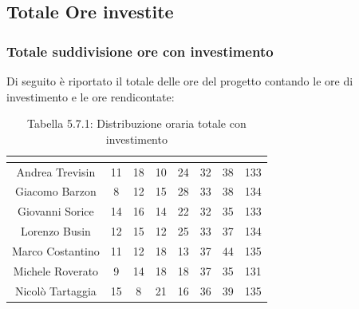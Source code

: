 \subsection{Totale Ore investite}

\subsubsection{Totale suddivisione ore con investimento}
Di seguito è riportato il totale delle ore del progetto contando le ore di investimento e le ore rendicontate:

\renewcommand{\arraystretch}{1.5}
\begin{table}[H]
\begin{center}
\begin{tabular}{|c|c|c|c|c|c|c|c|}
\hline
\rowcolor{title_row}
\textbf{\color{title_text}{Nome}} & \textbf{\color{title_text}{Resp.}} & \textbf{\color{title_text}{Ammi.}} & \textbf{\color{title_text}{Analist.}} & \textbf{\color{title_text}{Progett.}} & \textbf{\color{title_text}{Program.}} & \textbf{\color{title_text}{Verific.}} & \textbf{\color{title_text}{Totale}} \\ \hline
Andrea Trevisin  & 11 & 18 & 10 & 24 & 32 & 38 & 133 \\ \hline
Giacomo Barzon   & 8 & 12 & 15 & 28 & 33 & 38 & 134 \\ \hline
Giovanni Sorice  & 14 & 16 & 14 & 22 & 32 & 35 & 133 \\ \hline
Lorenzo Busin    & 12 & 15 & 12 & 25 & 33 & 37 & 134 \\ \hline
Marco Costantino & 11 & 12 & 18 & 13 & 37 & 44 & 135 \\ \hline
Michele Roverato & 9 & 14 & 18 & 18 & 37 & 35 & 131 \\ \hline
Nicolò Tartaggia & 15 & 8 & 21 & 16 & 36 & 39 & 135  \\ \hline
\end{tabular}
\caption{Tabella 5.7.1: Distribuzione oraria totale con investimento\label{}}
\end{center}
\end{table}
\renewcommand{\arraystretch}{1}


